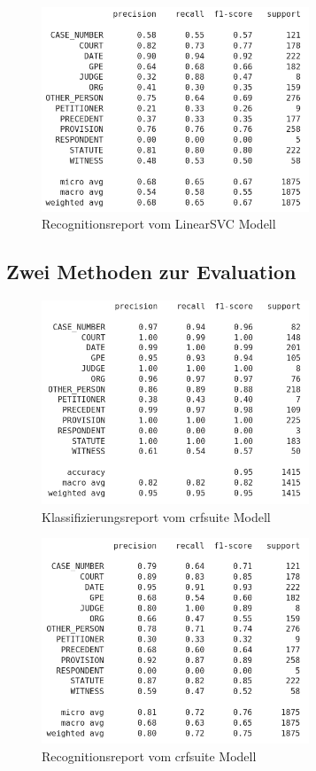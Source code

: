\documentclass[paper=A4, ngerman, fontsize=12pt]{article}
\begin{document}
	\begin{figure}
		\begin{center}
			\includegraphics[width=8cm]{Illustrations/svc_recognition.png}
			\caption{Recognitionsreport vom LinearSVC Modell}
			\label{Recognitionsreport vom LinearSVC Modell}
		\end{center}
	\end{figure}

	\subsection{Zwei Methoden zur Evaluation}
\begin{figure}
	\begin{center}
		\includegraphics[width=8cm]{Illustrations/crf_classify.png}
		\caption{Klassifizierungsreport vom crfsuite Modell}
		\label{Klassifizierungsreport vom crfsuite Modell}
	\end{center}
\end{figure}

\begin{figure}
	\begin{center}
		\includegraphics[width=8cm]{Illustrations/crf_recognition.png}
		\caption{Recognitionsreport vom crfsuite Modell}
		\label{Recognitionsreport vom crfsuite Modell}
	\end{center}
\end{figure}
\end{document}
